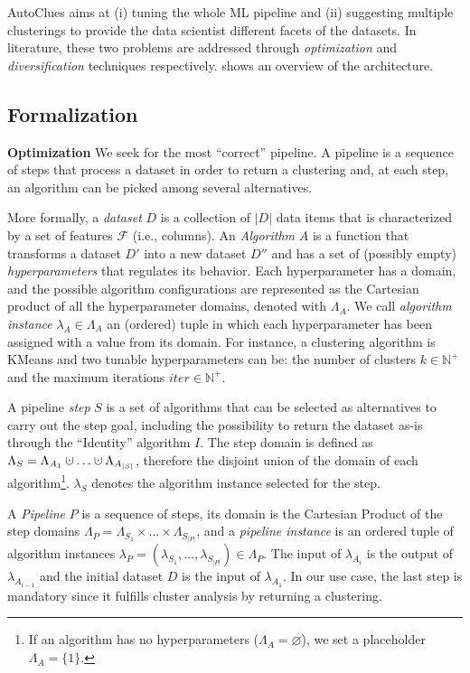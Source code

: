 \documentclass[runningheads]{llncs}
\newcommand{\cupdot}{\mathbin{\mathaccent\cdot\cup}}
\begin{document}
AutoClues aims at (i) tuning the whole ML pipeline and (ii) suggesting multiple clusterings to provide the data scientist different facets of the datasets. 
In literature, these two problems are addressed through \textit{optimization} and \textit{diversification} techniques respectively.
 shows an overview of the architecture.

\subsection{Formalization}
\label{ssec:formalization}

\textbf{Optimization} We seek for the most ``correct'' pipeline.
A pipeline is a sequence of steps that process a dataset in order to return a clustering and, at each step, an algorithm can be picked among several alternatives.

More formally, a \textit{dataset} $D$ is a collection of $|D|$ data items that is characterized by a set of features $\mathcal{F}$ (i.e., columns).
An \textit{Algorithm} $A$ is a function that transforms a dataset $D'$ into a new dataset $D''$ and has a set of (possibly empty) \textit{hyperparameters} that regulates its behavior.
Each hyperparameter has a domain, and the possible algorithm configurations are represented as the Cartesian product of all the hyperparameter domains, denoted with $\Lambda_A$.
We call \textit{algorithm instance} $\lambda_A \in \Lambda_A$ an (ordered) tuple in which each hyperparameter has been assigned with a value from its domain.
For instance, a clustering algorithm is KMeans and two tunable hyperparameters can be: the number of clusters $k \in \mathbb{N}^+$ and the maximum iterations $iter \in \mathbb{N}^+$. 

A pipeline \textit{step} $S$ is a set of algorithms that can be selected as alternatives to carry out the step goal, including the possibility to return the dataset as-is through the ``Identity'' algorithm $I$.
%
The step domain is defined as $\Lambda_S = \Lambda_{A_1} \cupdot \ldots \cupdot \Lambda_{A_{|S|}}$, therefore the disjoint union of the domain of each algorithm\footnote{If an algorithm has no hyperparameters ($\Lambda_{A} = \varnothing$), we set a placeholder $\Lambda_{A} = \{ 1 \}$.}. $\lambda_{S}$ denotes the algorithm instance selected for the step.

A \textit{Pipeline} $P$ is a sequence of steps, its domain is the Cartesian Product of the step domains $\Lambda_P = \Lambda_{S_1} \times \ldots \times \Lambda_{S_{|P|}}$, and a \textit{pipeline instance} is an ordered tuple of algorithm instances $\lambda_P = (\lambda_{S_1}, \ldots, \lambda_{S_{|P|}}) \in \Lambda_P$.
The input of $\lambda_{A_i}$ is the output of $\lambda_{A_{i-1}}$ and the initial dataset $D$ is the input of $\lambda_{A_{1}}$.
In our use case, the last step is mandatory since it fulfills cluster analysis by returning a clustering.
\end{document}
